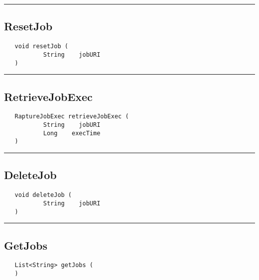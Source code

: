 \rule{15cm}{2pt}
\subsection{ResetJob}
\label{Api:ResetJob}
\begin{verbatim}
   void resetJob (
           String    jobURI
   )
\end{verbatim}



\rule{15cm}{2pt}
\subsection{RetrieveJobExec}
\label{Api:RetrieveJobExec}
\begin{verbatim}
   RaptureJobExec retrieveJobExec (
           String    jobURI
           Long    execTime
   )
\end{verbatim}



\rule{15cm}{2pt}
\subsection{DeleteJob}
\label{Api:DeleteJob}
\begin{verbatim}
   void deleteJob (
           String    jobURI
   )
\end{verbatim}



\rule{15cm}{2pt}
\subsection{GetJobs}
\label{Api:GetJobs}
\begin{verbatim}
   List<String> getJobs (
   )
\end{verbatim}



